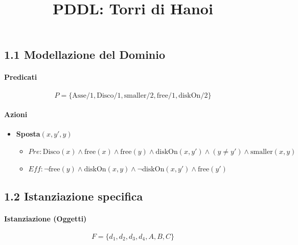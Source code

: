 \documentclass[a4paper,11pt]{article}
\title{PDDL: Torri di Hanoi}
\date{}
\begin{document}
\maketitle

\subsection*{1.1 Modellazione del Dominio} 

\paragraph{Predicati}
\[ P = \{\text{Asse}/1, \text{Disco}/1, \text{smaller}/2, \text{free}/1, \text{diskOn}/2\} \]

\paragraph{Azioni}

\begin{itemize}
    \item \textbf{Sposta}$(x, y', y)$
    \begin{itemize}
        \item $Pre: \text{Disco}(x) \land \text{free}(x) \land \text{free}(y) \land \text{diskOn}(x, y') \land (y \neq y') \land \text{smaller}(x, y)$
        \item $Eff: \neg \text{free}(y) \land \text{diskOn}(x, y) \land \neg \text{diskOn}(x, y') \land \text{free}(y')$
    \end{itemize}
\end{itemize}

\subsection*{1.2 Istanziazione specifica}

\paragraph{Istanziazione (Oggetti)}
\[ F = \{ d_1, d_2, d_3, d_4, A, B, C \} \]
\end{document}
